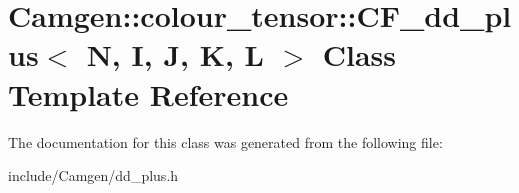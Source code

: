 \hypertarget{a00031}{}\section{Camgen\+:\+:colour\+\_\+tensor\+:\+:C\+F\+\_\+dd\+\_\+plus$<$ N, I, J, K, L $>$ Class Template Reference}
\label{a00031}


The documentation for this class was generated from the following file\+:\begin{DoxyCompactItemize}
\item 
include/\+Camgen/dd\+\_\+plus.\+h\end{DoxyCompactItemize}
